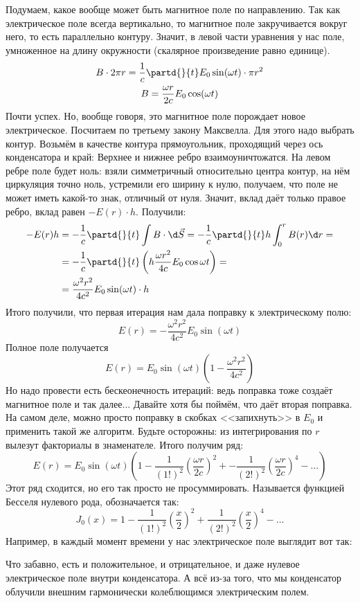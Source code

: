 	Подумаем, какое вообще может быть магнитное поле по направлению.
	Так как электрическое поле всегда вертикально, то магнитное поле закручивается вокруг него,
	то есть параллельно контуру.
	Значит, в левой части уравнения у нас поле, умноженное на длину окружности (скалярное произведение равно единице).
	\begin{gather*}
	B \cdot 2\pi r = \frac1c \partd{}{t} E_0 \sin (\omega t) \cdot \pi r^2 \\
	B = \frac{\omega r}{2c} E_0 \cos (\omega t)
	\end{gather*}
	Почти успех.
	Но, вообще говоря, это магнитное поле порождает новое электрическое.
	Посчитаем по третьему закону Максвелла.
	Для этого надо выбрать контур.
	Возьмём в качестве контура прямоугольник, проходящий через ось конденсатора и край:
    Верхнее и нижнее ребро взаимоуничтожатся.
    На левом ребре поле будет ноль: взяли симметричный относительно центра контур, на нём циркуляция точно ноль, устремили его ширину к нулю, получаем, что поле не может иметь какой-то знак, отличный от нуля.
    Значит, вклад даёт только правое ребро, вклад равен $- E(r) \cdot h$.
    Получили:
	\begin{align*}
	-E(r) h &= -\frac1c \partd{}{t} \int B \cdot \d \vec S = -\frac1c \partd{}{t} h \int_0^r B(r) \d r = \\
		&= -\frac1c \partd{}{t} \left( h \frac{\omega r^2}{4c}E_0 \cos \omega t \right) = \\
		&= \frac{\omega^2 r^2}{4c^2} E_0 \sin ( \omega t ) \cdot h
	\end{align*}
	Итого получили, что первая итерация нам дала поправку к электрическому полю:
	\[
	E(r) = - \frac{\omega^2 r^2}{4c^2} E_0 \sin ( \omega t )
	\]
	Полное поле получается
	\[
	E(r) = E_0 \sin (\omega t) \left(1 - \frac{\omega^2r^2}{4c^2} \right)
	\]
	Но надо провести есть бескеонечность итераций: ведь поправка тоже создаёт магнитное поле и так далее...
	Давайте хотя бы поймём, что даёт вторая поправка.
	На самом деле, можно просто поправку в скобках <<запихнуть>> в $E_0$ и применить такой же алгоритм.
	Будьте осторожны: из интегрирования по $r$ вылезут факториалы в знаменателе.
	Итого получим ряд:
	\[
	E(r) = E_0 \sin (\omega t) \left(1 - \frac{1}{(1!)^2} \left(\frac{\omega r}{2c} \right)^2 + - \frac{1}{(2!)^2} \left(\frac{\omega r}{2c} \right)^4 - \dots \right)
	\]
	Этот ряд сходится, но его так просто не просуммировать.
	Называется функцией Бесселя нулевого рода, обозначается так:
	\[
	J_0(x) = 1 - \frac{1}{(1!)^2} \left(\frac x 2\right) ^ 2 + \frac{1}{(2!)^2} \left(\frac x 2\right) ^ 4 - \dots
	\]
	Например, в каждый момент времени у нас электрическое поле выглядит вот так:

	Что забавно, есть и положительное, и отрицательное, и даже нулевое электрическое поле внутри конденсатора.
	А всё из-за того, что мы конденсатор облучили внешним гармонически колеблющимся электрическим полем.
